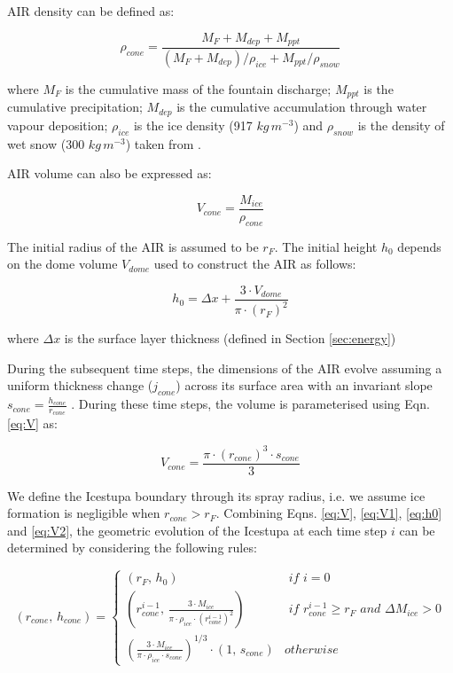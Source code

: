AIR density can be defined as:

\begin{equation}
  \rho_{cone} = \frac{M_{F} + M_{dep} + M_{ppt}}{(M_{F} + M_{dep})/\rho_{ice} + M_{ppt}/\rho_{snow}}
\end{equation}

where $M_F$ is the cumulative mass of the fountain discharge; $M_{ppt}$ is the cumulative precipitation;
$M_{dep}$ is the cumulative accumulation through water vapour deposition; $\rho_{ice}$ is the ice density (917
$kg\,m^{-3}$) and $\rho_{snow}$ is the density of wet snow (300 $kg\,m^{-3}$) taken from
\cite{cuffeyPhysicsGlaciers2010} .

AIR volume can also be expressed as:

\begin{equation} V_{cone} =\frac{M_{ice}} {\rho_{cone}} \label{eq:V1} \end{equation}

The initial radius of the AIR is assumed to be $r_F$. The initial height $h_0$ depends on the dome volume
$V_{dome}$ used to construct the AIR as follows:

\begin{equation}
	h_{0} =  \Delta x + \frac{3 \cdot V_{dome}}{\pi \cdot (r_F)^2 }
	\label{eq:h0}
\end{equation}

where $\Delta x$ is the surface layer thickness (defined in Section \ref{sec:energy})

During the subsequent time steps, the dimensions of the AIR evolve assuming a uniform thickness change ($j_{cone}$)
across its surface area with an invariant slope $s_{cone} = \frac{h_{cone}}{r_{cone}}$ .  During these time
steps, the volume is parameterised using Eqn. \ref{eq:V} as:

\begin{equation} V_{cone} = \frac{\pi \cdot {(r_{cone})}^3
		\cdot s_{cone}}{3} \label{eq:V2} \end{equation}

We define the Icestupa boundary through its spray radius, i.e. we assume ice formation is negligible when $r_{cone} >
	r_{F}$. Combining Eqns. \ref{eq:V},  \ref{eq:V1}, \ref{eq:h0} and \ref{eq:V2}, the geometric evolution of the
Icestupa at each time step $i$ can be determined by considering the following rules:

\begin{equation} (r_{cone},\, h_{cone}) = \left\{ \begin{array}{ll} (r_F ,\, h_0)                                                                          & \textit{ if } i=0 \\
		(r_{cone}^{i-1},\, \frac{3 \cdot M_{ice}}{\pi \cdot \rho_{ice} \cdot {(r_{cone}^{i-1})}^2}) & \textit{ if }
		r_{cone}^{i-1} \geq r_{F} \textit{ and } \Delta M_{ice} > 0                                                     \\ (\frac{3 \cdot M_{ice}}{\pi \cdot \rho_{ice} \cdot s_{cone}})^{1/3} \cdot (1,\,  s_{cone}) &
		otherwise\end{array} \right.  \label{eq:A2} \end{equation}


